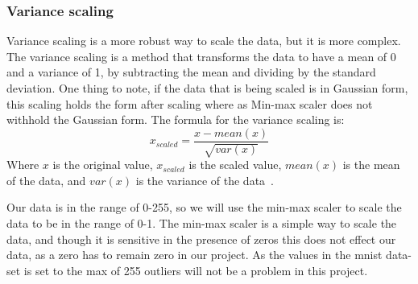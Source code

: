 \subsubsection{Variance scaling}
Variance scaling is a more robust way to scale the data, but it is more complex. The variance scaling is a method that transforms the data to have a mean of 0 and a variance of 1, by subtracting the mean and dividing by the standard deviation. One thing to note, if the data that is being scaled is in Gaussian form, this scaling holds the form after scaling where as Min-max scaler does not withhold the Gaussian form. The formula for the variance scaling is:
\begin{equation}
    x_{scaled} = \frac{x - mean(x)}{\sqrt{var(x)}}
\end{equation}
Where $x$ is the original value, $x_{scaled}$ is the scaled value, $mean(x)$ is the mean of the data, and $var(x)$ is the variance of the data~\cite{Feature-engineering-zheng}. 

Our data is in the range of 0-255, so we will use the min-max scaler to scale the data to be in the range of 0-1. The min-max scaler is a simple way to scale the data, and though it is sensitive in the presence of zeros this does not effect our data, as a zero has to remain zero in our project. As the values in the \gls{mnist} data-set is set to the max of 255 outliers will not be a problem in this project.